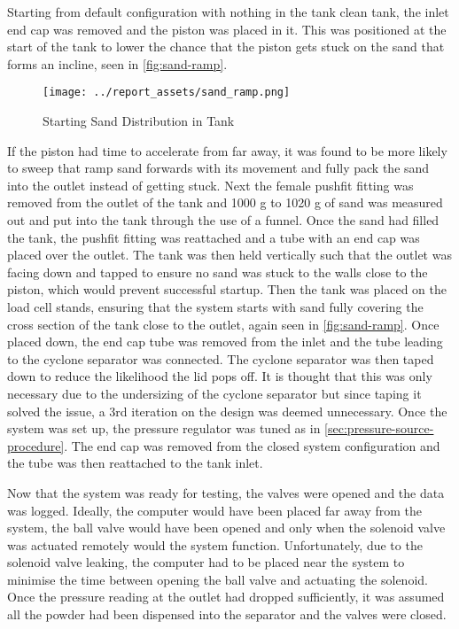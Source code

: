 Starting from default configuration with nothing in the tank clean tank, the inlet end cap was removed and the piston was placed in it. This was positioned at the start of the tank to lower the chance that the piston gets stuck on the sand that forms an incline, seen in \autoref{fig:sand-ramp}.
\begin{figure}[htbp]
    \centering
    
    \begin{minipage}{0.60\textwidth}
        \centering
        \texttt{[image: ../report\_assets/sand\_ramp.png]}
        \caption{Starting Sand Distribution in Tank}\label{fig:sand-ramp}
    \end{minipage}

\end{figure}
If the piston had time to accelerate from far away, it was found to be more likely to sweep that ramp sand forwards with its movement and fully pack the sand into the outlet instead of getting stuck. Next the female pushfit fitting was removed from the outlet of the tank and 1000 g to 1020 g of sand was measured out and put into the tank through the use of a funnel. Once the sand had filled the tank, the pushfit fitting was reattached and a tube with an end cap was placed over the outlet. The tank was then held vertically such that the outlet was facing down and tapped to ensure no sand was stuck to the walls close to the piston, which would prevent successful startup. Then the tank was placed on the load cell stands, ensuring that the system starts with sand fully covering the cross section of the tank close to the outlet, again seen in \autoref{fig:sand-ramp}. Once placed down, the end cap tube was removed from the inlet and the tube leading to the cyclone separator was connected. The cyclone separator was then taped down to reduce the likelihood the lid pops off. It is thought that this was only necessary due to the undersizing of the cyclone separator but since taping it solved the issue, a 3rd iteration on the design was deemed unnecessary. Once the system was set up, the pressure regulator was tuned as in \autoref{sec:pressure-source-procedure}. The end cap was removed from the closed system configuration and the tube was then reattached to the tank inlet.

Now that the system was ready for testing, the valves were opened and the data was logged. Ideally, the computer would have been placed far away from the system, the ball valve would have been opened and only when the solenoid valve was actuated remotely would the system function. Unfortunately, due to the solenoid valve leaking, the computer had to be placed near the system to minimise the time between opening the ball valve and actuating the solenoid. Once the pressure reading at the outlet had dropped sufficiently, it was assumed all the powder had been dispensed into the separator and the valves were closed.

